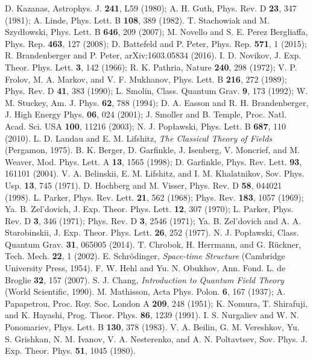 \documentclass[prd,onecolumn,nofootinbib]{revtex4}
\begin{document}
\begin{thebibliography}{}
 D. Kazanas, Astrophys. J. {\bf 241}, L59 (1980); A. H. Guth, Phys. Rev. D {\bf 23}, 347 (1981); A. Linde, Phys. Lett. B {\bf 108}, 389 (1982).
 T. Stachowiak and M. Szyd{\l}owski, Phys. Lett. B {\bf 646}, 209 (2007); M. Novello and S. E. Perez Bergliaffa, Phys. Rep. {\bf 463}, 127 (2008); D. Battefeld and P. Peter, Phys. Rep. {\bf 571}, 1 (2015); R. Brandenberger and P. Peter, arXiv:1603.05834 (2016).
 I. D. Novikov, J. Exp. Theor. Phys. Lett. {\bf 3}, 142 (1966); R. K. Pathria, Nature {\bf 240}, 298 (1972); V. P. Frolov, M. A. Markov, and V. F. Mukhanov, Phys. Lett. B {\bf 216}, 272 (1989); Phys. Rev. D {\bf 41}, 383 (1990); L. Smolin, Class. Quantum Grav. {\bf 9}, 173 (1992); W. M. Stuckey, Am. J. Phys. {\bf 62}, 788 (1994); D. A. Easson and R. H. Brandenberger, J. High Energy Phys. {\bf 06}, 024 (2001); J. Smoller and B. Temple, Proc. Natl. Acad. Sci. USA {\bf 100}, 11216 (2003); N. J. Pop{\l}awski, Phys. Lett. B {\bf 687}, 110 (2010).
 L. D. Landau and E. M. Lifshitz, {\em The Classical Theory of Fields} (Pergamon, 1975).
 B. K. Berger, D. Garfinkle, J. Isenberg, V. Moncrief, and M. Weaver, Mod. Phys. Lett. A {\bf 13}, 1565 (1998); D. Garfinkle, Phys. Rev. Lett. {\bf 93}, 161101 (2004).
 V. A. Belinskii, E. M. Lifshitz, and I. M. Khalatnikov, Sov. Phys. Usp. {\bf 13}, 745 (1971).
 D. Hochberg and M. Visser, Phys. Rev. D {\bf 58}, 044021 (1998).
 L. Parker, Phys. Rev. Lett. {\bf 21}, 562 (1968); Phys. Rev. {\bf 183}, 1057 (1969); Ya. B. Zel'dovich, J. Exp. Theor. Phys. Lett. {\bf 12}, 307 (1970); L. Parker, Phys. Rev. D {\bf 3}, 346 (1971); Phys. Rev. D {\bf 3}, 2546 (1971); Ya. B. Zel'dovich and A. A. Starobinskii, J. Exp. Theor. Phys. Lett. {\bf 26}, 252 (1977).
 N. J. Pop{\l}awski, Class. Quantum Grav. {\bf 31}, 065005 (2014).
 T. Chrobok, H. Herrmann, and G. R\"{u}ckner, Tech. Mech. {\bf 22}, 1 (2002).
 E. Schr\"{o}dinger, {\em Space-time Structure} (Cambridge University Press, 1954).
 F. W. Hehl and Yu. N. Obukhov, Ann. Fond. L. de Broglie {\bf 32}, 157 (2007).
 S. J. Chang, {\em Introduction to Quantum Field Theory} (World Scientific, 1990).
 M. Mathisson, Acta Phys. Polon. {\bf 6}, 167 (1937); A. Papapetrou, Proc. Roy. Soc. London A {\bf 209}, 248 (1951); K. Nomura, T. Shirafuji, and K. Hayashi, Prog. Theor. Phys. {\bf 86}, 1239 (1991).
 I. S. Nurgaliev and W. N. Ponomariev, Phys. Lett. B {\bf 130}, 378 (1983).
 V. A. Beilin, G. M. Vereshkov, Yu. S. Grishkan, N. M. Ivanov, V. A. Nesterenko, and A. N. Poltavtsev, Sov. Phys. J. Exp. Theor. Phys. {\bf 51}, 1045 (1980).

\end{thebibliography}
\end{document}
